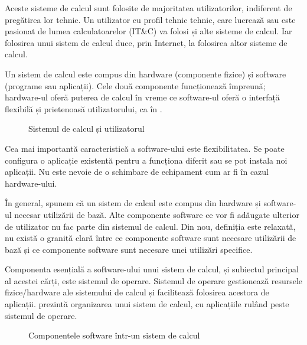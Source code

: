 Aceste sisteme de calcul sunt folosite de majoritatea utilizatorilor, indiferent de pregătirea lor tehnic. Un utilizator cu profil tehnic tehnic, care lucrează sau este pasionat de lumea calculatoarelor (IT\&C) va folosi și alte sisteme de calcul. Iar folosirea unui sistem de calcul duce, prin Internet, la folosirea altor sisteme de calcul.

Un sistem de calcul este compus din hardware (componente fizice) și software (programe sau aplicații). Cele două componente funcționează împreună; hardware-ul oferă puterea de calcul în vreme ce software-ul oferă o interfață flexibilă și prietenoasă utilizatorului, ca în .

\begin{figure}[htbp]
  \centering
  \def\svgwidth{\columnwidth}
  
  \caption{Sistemul de calcul și utilizatorul}
  \label{fig:intro:computing-system}
\end{figure}

Cea mai importantă caracteristică a software-ului este flexibilitatea. Se poate configura o aplicație existentă pentru a funcționa diferit sau se pot instala noi aplicații. Nu este nevoie de o schimbare de echipament cum ar fi în cazul hardware-ului.

În general, spunem că un sistem de calcul este compus din hardware și software-ul necesar utilizării de bază. Alte componente software ce vor fi adăugate ulterior de utilizator nu fac parte din sistemul de calcul. Din nou, definiția este relaxată, nu există o graniță clară între ce componente software sunt necesare utilizării de bază și ce componente software sunt necesare unei utilizări specifice.

Componenta esențială a software-ului unui sistem de calcul, și subiectul principal al acestei cărți, este sistemul de operare. Sistemul de operare gestionează resursele fizice/hardware ale sistemului de calcul și facilitează folosirea acestora de aplicații.  prezintă organizarea unui sistem de calcul, cu aplicațiile rulând peste sistemul de operare.

\begin{figure}[htbp]
  \centering
  \def\svgwidth{\columnwidth}
  
  \caption{Componentele software într-un sistem de calcul}
  \label{fig:intro:computing-software}
\end{figure}

